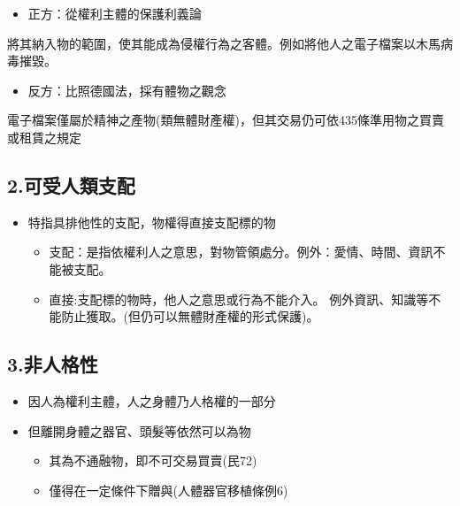 \documentclass[
]{book}
\providecommand{\tightlist}{%
  \setlength{\itemsep}{0pt}\setlength{\parskip}{0pt}}
\begin{document}
\begin{itemize}
\tightlist
\item
  正方：從權利主體的保護利義論
\end{itemize}

將其納入物的範圍，使其能成為侵權行為之客體。例如將他人之電子檔案以木馬病毒摧毀。

\begin{itemize}
\tightlist
\item
  反方：比照德國法，採有體物之觀念
\end{itemize}

電子檔案僅屬於精神之產物(類無體財產權)，但其交易仍可依435條準用物之買賣或租賃之規定

\hypertarget{ux53efux53d7ux4ebaux985eux652fux914d}{%
\subsection{2.可受人類支配}\label{ux53efux53d7ux4ebaux985eux652fux914d}}

\begin{itemize}
\item
  特指具排他性的支配，物權得直接支配標的物

  \begin{itemize}
  \item
    支配：是指依權利人之意思，對物管領處分。例外：愛情、時間、資訊不能被支配。
  \item
    直接:支配標的物時，他人之意思或行為不能介入。
    例外資訊、知識等不能防止獲取。(但仍可以無體財產權的形式保護)。
  \end{itemize}
\end{itemize}

\hypertarget{ux975eux4ebaux683cux6027}{%
\subsection{3.非人格性}\label{ux975eux4ebaux683cux6027}}

\begin{itemize}
\item
  因人為權利主體，人之身體乃人格權的一部分
\item
  但離開身體之器官、頭髮等依然可以為物

  \begin{itemize}
  \item
    其為不通融物，即不可交易買賣(民72)
  \item
    僅得在一定條件下贈與(人體器官移植條例6)
  \end{itemize}
\end{itemize}
\end{document}
